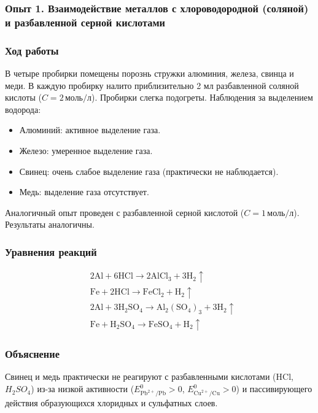 \documentclass[a4paper,12pt]{article}
\begin{document}
	
	\subsubsection*{Опыт 1. Взаимодействие металлов с хлороводородной (соляной) и разбавленной серной кислотами}
	
	\subsubsection*{Ход работы}
	
	\quad В четыре пробирки помещены порознь стружки алюминия, железа, свинца и меди. В каждую пробирку налито приблизительно 2 мл разбавленной соляной кислоты (\(C = 2 \, \text{моль/л}\)). Пробирки слегка подогреты. Наблюдения за выделением водорода:
	
	\begin{itemize}
		\item Алюминий: активное выделение газа.
		\item Железо: умеренное выделение газа.
		\item Свинец: очень слабое выделение газа (практически не наблюдается).
		\item Медь: выделение газа отсутствует.
	\end{itemize}
	
	\quad Аналогичный опыт проведен с разбавленной серной кислотой (\(C = 1 \, \text{моль/л}\)). Результаты аналогичны.
	
	\subsubsection*{Уравнения реакций}
	\begin{align*}
		& 2\text{Al} + 6\text{HCl} \rightarrow 2\text{AlCl}_3 + 3\text{H}_2 \uparrow \\
		& \text{Fe} + 2\text{HCl} \rightarrow \text{FeCl}_2 + \text{H}_2 \uparrow \\
		& 2\text{Al} + 3\text{H}_2\text{SO}_4 \rightarrow \text{Al}_2(\text{SO}_4)_3 + 3\text{H}_2 \uparrow \\
		& \text{Fe} + \text{H}_2\text{SO}_4 \rightarrow \text{FeSO}_4 + \text{H}_2 \uparrow
	\end{align*}
	
	\subsubsection*{Объяснение}
	
	\quad Свинец и медь практически не реагируют с разбавленными кислотами (HCl, \(H_2SO_4\)) из-за низкой активности (\(E^0_{\text{Pb}^{2+}/\text{Pb}} > 0\), \(E^0_{\text{Cu}^{2+}/\text{Cu}} > 0\)) и пассивирующего действия образующихся хлоридных и сульфатных слоев.
	
\end{document}
